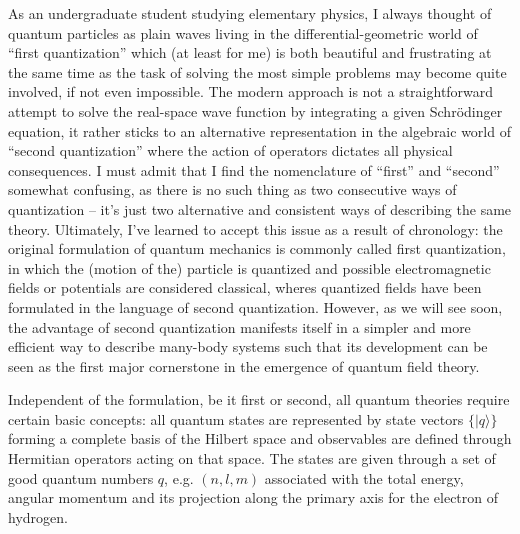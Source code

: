 As an undergraduate student studying elementary physics, I always thought of quantum particles as plain waves living in the differential-geometric world of ``first quan\-ti\-zation'' which (at least for me) is both beautiful and frustrating at the same time as the task of solving the most simple problems may become quite involved, if not even impossible.
The modern approach is not a straightforward attempt to solve the real-space wave function by integrating a given Schrödinger equation, it rather sticks to an alternative representation in the algebraic world of ``second quantization'' where the action of operators dictates all physical consequences.
I must admit that I find the nomenclature of ``first'' and ``second'' somewhat confusing, as there is no such thing as two consecutive ways of quantization -- it's just two alternative and consistent ways of describing the same theory.
Ultimately, I've learned to accept this issue as a result of chronology: the original formulation of quantum mechanics is commonly called first quantization, in which the (motion of the) particle is quantized and possible electromagnetic fields or potentials are considered classical, wheres quantized fields have been formulated in the language of second quantization.
However, as we will see soon, the advantage of second quantization manifests itself in a simpler and more efficient way to describe many-body systems such that its development can be seen as the first major cornerstone in the emergence of quantum field theory.

Independent of the formulation, be it first or second, all quantum theories require certain basic concepts:
all quantum states are represented by state vectors $\{|q\rangle\}$ forming a complete basis of the Hilbert space and observables are defined through Hermitian operators acting on that space.
The states are given through a set of good quantum numbers $q$, e.g. $(n,l,m)$ associated with the total energy, angular momentum and its projection along the primary axis for the electron of hydrogen.

